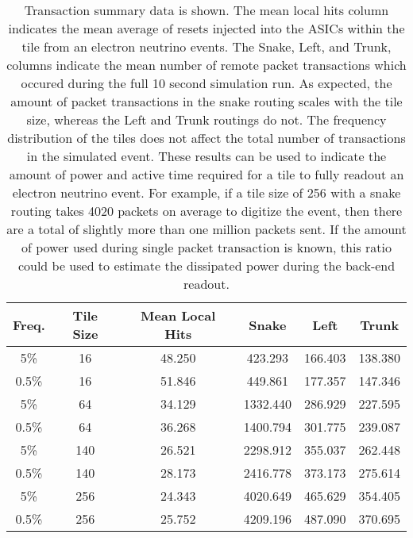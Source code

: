 \begin{table}
	\begin{center}
		\begin{tabular}{|c|c|c|c|c|c|}
			\hline
			Freq. & Tile Size & Mean Local Hits & Snake & Left & Trunk \\
			\hline
			5\% & 16 & 48.250 & 423.293 & 166.403 & 138.380 \\
			\hline
			0.5\% & 16 & 51.846 & 449.861 & 177.357 & 147.346 \\
			\hline
			5\% & 64 & 34.129 & 1332.440 & 286.929 & 227.595 \\
			\hline
			0.5\% & 64 & 36.268 & 1400.794 & 301.775 & 239.087 \\
			\hline
			5\% & 140 & 26.521 & 2298.912 & 355.037 & 262.448 \\
			\hline
			0.5\% & 140 & 28.173 & 2416.778 & 373.173 & 275.614 \\
			\hline
			5\% & 256 & 24.343 & 4020.649 & 465.629 & 354.405 \\
			\hline
			0.5\% & 256 & 25.752 & 4209.196 & 487.090 & 370.695 \\
			\hline
		\end{tabular}
	\end{center}
	\caption{Transaction summary data is shown.
	The mean local hits column indicates the mean average of resets injected into the ASICs within the tile from an electron neutrino events.
	The Snake, Left, and Trunk, columns indicate the mean number of remote packet transactions which occured during the full 10 second simulation run.
	As expected, the amount of packet transactions in the snake routing scales with the tile size, whereas the Left and Trunk routings do not.
	The frequency distribution of the tiles does not affect the total number of transactions in the simulated event.
	These results can be used to indicate the amount of power and active time required for a tile to fully readout an electron neutrino event. 
	For example, if a tile size of 256 with a snake routing takes 4020 packets on average to digitize the event, then there are a total of slightly more than one million packets sent.
	If the amount of power used during single packet transaction is known, this ratio could be used to estimate the dissipated power during the back-end readout. 
	}
	\label{tab:transact}
\end{table}
